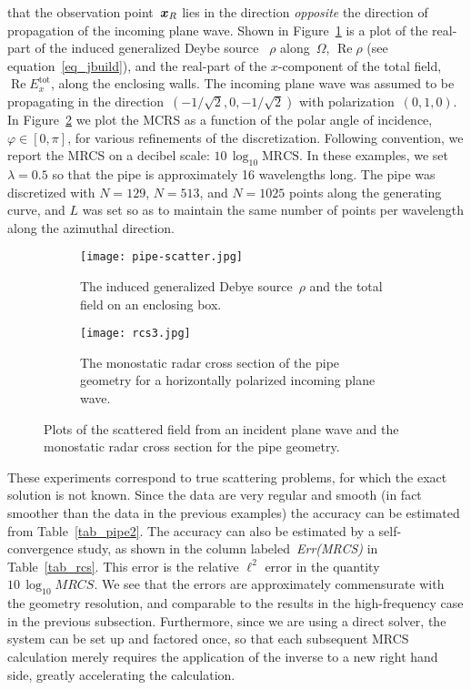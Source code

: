 \documentclass[11pt]{article}
\DeclareMathOperator{\realpart}{Re}
\renewcommand{\phi}{\varphi}
\newcommand{\vct}{\vectorsym}
\newcommand{\bx}{\vct{ x}}
\numberwithin{equation}{section}
\begin{document}
that the observation point~$\bx_R$ lies in the direction
\emph{opposite} the direction of propagation of the incoming plane
wave.  Shown in Figure~\ref{fig_mrcs1} is a plot of the real-part of
the induced generalized Deybe source ~$\rho$ along~$\Omega$,
$\realpart \rho$ (see equation~\eqref{eq_jbuild}), and the real-part
of the $x$-component of the total field, $\realpart E^{\text{tot}}_x$,
along the enclosing walls. The incoming plane wave
was assumed to be propagating in the direction~$(-1/\sqrt{2},0,-1/\sqrt{2})$ with
polarization~$(0,1,0)$. In Figure~\ref{fig_mrcs2}
we plot the MCRS as a function of the polar angle of incidence, $\phi
\in [0,\pi]$, for various refinements of the discretization. 
Following convention, we
report the MRCS on a decibel scale: $10 \, \log_{10} \text{MRCS}$.
In these examples, we set $\lambda= 0.5$ so that the pipe is
approximately 16 wavelengths long. The pipe was discretized with
$N=129$, $N=513$, and $N=1025$ points along the generating curve, 
and $L$ was set so as to maintain the same
number of points per wavelength along the azimuthal direction.


\begin{figure}[!t]
  \centering
  \begin{subfigure}[b]{.4\linewidth}
    \centering
    \texttt{[image: pipe-scatter.jpg]}
    \caption{The induced generalized Debye source~$\rho$
      and the total field 
      on an enclosing box.}
    \label{fig_mrcs1}
  \end{subfigure}
  \hfill
  \begin{subfigure}[b]{.55\linewidth}
    \centering
    \texttt{[image: rcs3.jpg]}
    \caption{The monostatic radar cross section of the pipe geometry
      for a horizontally polarized incoming plane wave.}
    \label{fig_mrcs2}
  \end{subfigure}
  \caption{Plots of the scattered field from an incident plane wave and the
    monostatic radar cross section for the pipe geometry.}
  \label{fig_mrcs}
\end{figure}

These experiments correspond to true scattering problems, for which the
exact solution is not known. Since the data are very regular and smooth
(in fact smoother than the data in the previous examples) the accuracy
can be estimated from Table~\ref{tab_pipe2}.  The accuracy can also be
estimated by a self-convergence study, as shown in the column
labeled~\emph{Err(MRCS)} in Table~\ref{tab_rcs}. This
error is the relative $\ell^2$ error in the quantity
$10 \, \log_{10} MRCS$.  We see that the errors are approximately
commensurate with the geometry resolution, and comparable to the
results in the high-frequency case in the previous subsection.
Furthermore, since we are using a direct solver, the system can be set
up and factored once, so that each subsequent MRCS calculation merely
requires the application of the inverse to a new right hand side,
greatly accelerating the calculation.
\end{document}
